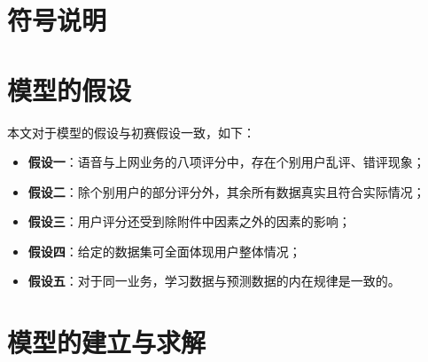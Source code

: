 \documentclass{MathorCupmodeling}
\begin{document}
	\section{符号说明}
	\begin{center}
	\end{center}
	\section{模型的假设}
	本文对于模型的假设与初赛假设一致，如下：
	\begin{itemize}
		\item \textbf{假设一}：语音与上网业务的八项评分中，存在个别用户乱评、错评现象；
		\item \textbf{假设二}：除个别用户的部分评分外，其余所有数据真实且符合实际情况；
		\item \textbf{假设三}：用户评分还受到除附件中因素之外的因素的影响；
		\item \textbf{假设四}：给定的数据集可全面体现用户整体情况；
		\item \textbf{假设五}：对于同一业务，学习数据与预测数据的内在规律是一致的。
	\end{itemize}
	\section{模型的建立与求解}
\end{document}
